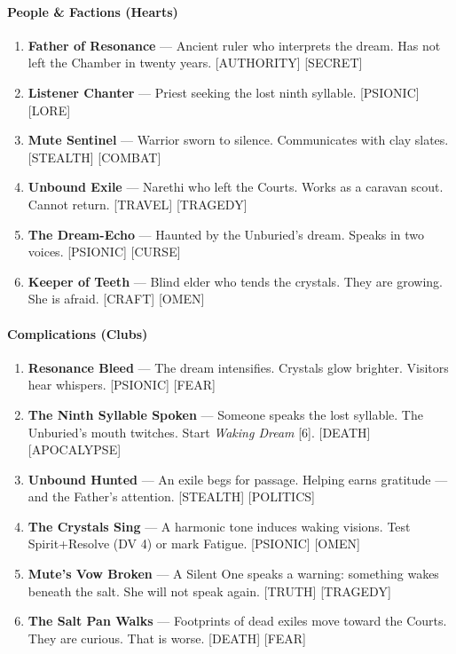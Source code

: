 \paragraph{People \& Factions (Hearts)}
\begin{enumerate}
    \item \textbf{Father of Resonance} --- Ancient ruler who interprets the dream. Has not left the Chamber in twenty years. [AUTHORITY] [SECRET]
    \item \textbf{Listener Chanter} --- Priest seeking the lost ninth syllable. [PSIONIC] [LORE]
    \item \textbf{Mute Sentinel} --- Warrior sworn to silence. Communicates with clay slates. [STEALTH] [COMBAT]
    \item \textbf{Unbound Exile} --- Narethi who left the Courts. Works as a caravan scout. Cannot return. [TRAVEL] [TRAGEDY]
    \item \textbf{The Dream-Echo} --- Haunted by the Unburied's dream. Speaks in two voices. [PSIONIC] [CURSE]
    \item \textbf{Keeper of Teeth} --- Blind elder who tends the crystals. They are growing. She is afraid. [CRAFT] [OMEN]
\end{enumerate}

\paragraph{Complications (Clubs)}
\begin{enumerate}
    \item \textbf{Resonance Bleed} --- The dream intensifies. Crystals glow brighter. Visitors hear whispers. [PSIONIC] [FEAR]
    \item \textbf{The Ninth Syllable Spoken} --- Someone speaks the lost syllable. The Unburied's mouth twitches. Start \textit{Waking Dream} [6]. [DEATH] [APOCALYPSE]
    \item \textbf{Unbound Hunted} --- An exile begs for passage. Helping earns gratitude --- and the Father's attention. [STEALTH] [POLITICS]
    \item \textbf{The Crystals Sing} --- A harmonic tone induces waking visions. Test Spirit+Resolve (DV 4) or mark Fatigue. [PSIONIC] [OMEN]
    \item \textbf{Mute's Vow Broken} --- A Silent One speaks a warning: something wakes beneath the salt. She will not speak again. [TRUTH] [TRAGEDY]
    \item \textbf{The Salt Pan Walks} --- Footprints of dead exiles move toward the Courts. They are curious. That is worse. [DEATH] [FEAR]
\end{enumerate}

